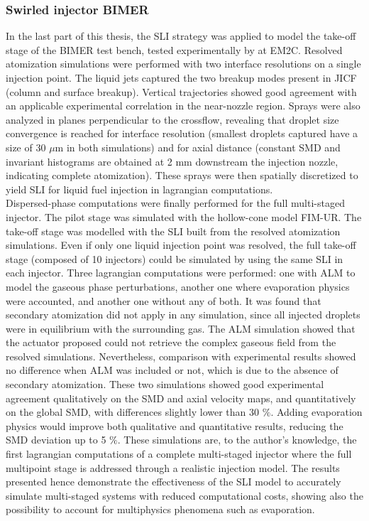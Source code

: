 \subsubsection*{Swirled injector BIMER}

In the last part of this thesis, the SLI strategy was applied to model the take-off stage of the BIMER test bench, tested experimentally by  at EM2C. Resolved atomization simulations were performed with two interface resolutions on a single injection point. The liquid jets captured the two breakup modes present in JICF (column and surface breakup). Vertical trajectories showed good agreement with an applicable experimental correlation in the near-nozzle region. Sprays were also analyzed in planes perpendicular to the crossflow, revealing that droplet size convergence is reached for interface resolution (smallest droplets captured have a size of 30 $\mu$m in both simulations) and for axial distance (constant SMD and invariant histograms are obtained at 2 mm downstream the injection nozzle, indicating complete atomization). These sprays were then spatially discretized to yield SLI for liquid fuel injection in lagrangian computations. \\

Dispersed-phase computations were finally performed for the full multi-staged injector. The pilot stage was simulated with the hollow-cone model FIM-UR. The take-off stage was modelled with the SLI built from the resolved atomization simulations. Even if only one liquid injection point was resolved, the full take-off stage (composed of 10 injectors) could be simulated by using the same SLI in each injector. Three lagrangian computations were performed: one with ALM to model the gaseous phase perturbations, another one where evaporation physics were accounted, and another one without any of both. It was found that secondary atomization did not apply in any simulation, since all injected droplets were in equilibrium with the surrounding gas. The ALM simulation showed that the actuator proposed could not retrieve the complex gaseous field from the resolved simulations. Nevertheless, comparison with experimental results showed no difference when ALM was included or not, which is due to the absence of secondary atomization. These two simulations showed good experimental agreement qualitatively on the SMD and axial velocity maps, and quantitatively on the global SMD, with differences slightly lower than 30 $\%$. Adding evaporation physics would improve both qualitative and quantitative results, reducing the SMD deviation up to 5 $\%$. These simulations are, to the author's knowledge, the first lagrangian computations of a complete multi-staged injector where the full multipoint stage is addressed through a realistic 
injection model. The results presented hence demonstrate the effectiveness of the SLI model to accurately simulate multi-staged systems with reduced computational costs, showing also the possibility to account for multiphysics phenomena such as evaporation.

